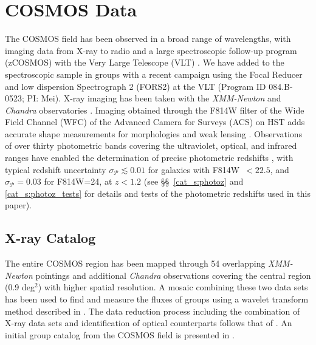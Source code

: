 
\section{COSMOS Data}
\label{cat_s:data}

The COSMOS field has been observed in a broad range of wavelengths,
with imaging data from X-ray to radio and a large spectroscopic
follow-up program (zCOSMOS) with the Very Large Telescope (VLT)
\citep{Scoville2007a,Koekemoer2007,Lilly2007}. We have added to the
spectroscopic sample in groups with a recent campaign using the
Focal Reducer and low dispersion Spectrograph 2 (FORS2) at the VLT
(Program ID 084.B-0523; PI: Mei). 
X-ray imaging has been taken with the {\sl XMM-Newton} \citep[1.5~Ms covering
2.13~deg$^2$;][]{Hasinger2007,Cappelluti2009} and {\sl Chandra} 
observatories \citep[1.8~Ms covering 0.9~deg$^2$;][]{Elvis2009}.  Imaging
obtained through the F814W filter of the Wide Field Channel (WFC) of
the Advanced Camera for Surveys (ACS) on HST adds accurate shape measurements for
morphologies and weak lensing \citep{Scarlata2007,Leauthaud2007}.
Observations of over thirty photometric bands covering the ultraviolet,
optical, and infrared ranges have enabled the determination 
of precise photometric redshifts \citep{Capak2007b,Ilbert2009}, with
typical redshift uncertainty $\sigma_{\mathcal{P}}\lesssim0.01$ for galaxies
with F814W~$<22.5$, and $\sigma_{\mathcal{P}}=0.03$ for F814W=24, at
$z<1.2$ (see \S\S~\ref{cat_s:photoz} and \ref{cat_s:photoz_tests} for details
and tests of the photometric redshifts used in this paper).

\subsection{X-ray Catalog}
\label{cat_s:xray}

The entire COSMOS region has been mapped through 54 overlapping {\sl
  XMM-Newton} pointings and additional {\sl Chandra} observations
covering the central region (0.9 deg$^2$) with higher spatial
resolution. A mosaic combining these two data sets has been used to
find and measure the fluxes of groups using a wavelet transform method
described in \citet{Vikhlinin1998}. The data reduction process
including the combination of X-ray data sets and identification of
optical counterparts follows that of \citet{Finoguenov2009,
  Finoguenov2010}. An initial group catalog from the COSMOS field is
presented in \citet{Finoguenov2007}.

